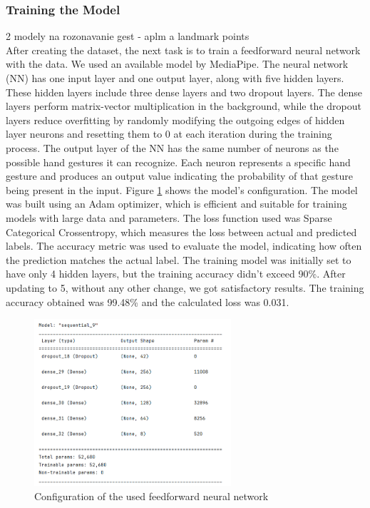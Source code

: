 \subsubsection*{Training the Model}

2 modely na rozonavanie gest - aplm a landmark points\\


After creating the dataset, the next task is to train a feedforward neural network with the data.
We used an available model by MediaPipe. %
The neural network (NN) has one input layer and one output layer, along with five hidden layers. These hidden layers include three dense layers and two dropout layers. The dense layers perform matrix-vector multiplication in the background, while the dropout layers reduce overfitting by randomly modifying the outgoing edges of hidden layer neurons and resetting them to 0 at each iteration during the training process.
The output layer of the NN has the same number of neurons as the possible hand gestures it can recognize. Each neuron represents a specific hand gesture and produces an output value indicating the probability of that gesture being present in the input.
Figure \ref{fig:layers} shows the model's configuration. The model was built using an Adam optimizer, which is efficient and suitable for training models with large data and parameters. The loss function used was Sparse Categorical Crossentropy, which measures the loss between actual and predicted labels. The accuracy metric was used to evaluate the model, indicating how often the prediction matches the actual label. The training model was initially set to have only 4 hidden layers, but the training accuracy didn't exceed 90\%. After updating to 5, without any other change, we got satisfactory results. The training accuracy obtained was 99.48\% and the calculated loss was 0.031.
\begin{figure}
	\centering
	\includegraphics[width = 0.65\textwidth]{images/model_summ.png}
	\caption{Configuration of the used feedforward neural network}
	\label{fig:layers}
\end{figure}

